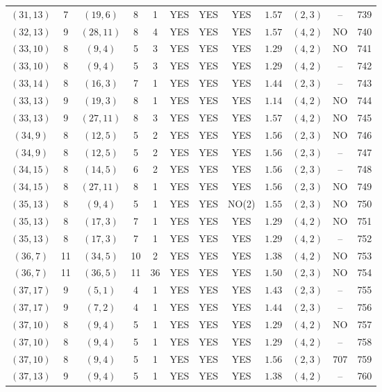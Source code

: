 \begin{longtable}{|c|c|c|c|c|c|c|c|c|c|c|c|}
$(31,13)$ & 7 & $(19,6)$ & 8 & 1 & YES & YES & YES & $1.57$ & $(2,3)$ & -- & 739\\
$(32,13)$ & 9 & $(28,11)$ & 8 & 4 & YES & YES & YES & $1.57$ & $(4,2)$ & NO & 740\\
$(33,10)$ & 8 & $(9,4)$ & 5 & 3 & YES & YES & YES & $1.29$ & $(4,2)$ & NO & 741\\
$(33,10)$ & 8 & $(9,4)$ & 5 & 3 & YES & YES & YES & $1.29$ & $(4,2)$ & -- & 742\\
$(33,14)$ & 8 & $(16,3)$ & 7 & 1 & YES & YES & YES & $1.44$ & $(2,3)$ & -- & 743\\
$(33,13)$ & 9 & $(19,3)$ & 8 & 1 & YES & YES & YES & $1.14$ & $(4,2)$ & NO & 744\\
$(33,13)$ & 9 & $(27,11)$ & 8 & 3 & YES & YES & YES & $1.57$ & $(4,2)$ & NO & 745\\
$(34,9)$ & 8 & $(12,5)$ & 5 & 2 & YES & YES & YES & $1.56$ & $(2,3)$ & NO & 746\\
$(34,9)$ & 8 & $(12,5)$ & 5 & 2 & YES & YES & YES & $1.56$ & $(2,3)$ & -- & 747\\
$(34,15)$ & 8 & $(14,5)$ & 6 & 2 & YES & YES & YES & $1.56$ & $(2,3)$ & -- & 748\\
$(34,15)$ & 8 & $(27,11)$ & 8 & 1 & YES & YES & YES & $1.56$ & $(2,3)$ & NO & 749\\
$(35,13)$ & 8 & $(9,4)$ & 5 & 1 & YES & YES & NO(2) & $1.55$ & $(2,3)$ & NO & 750\\
$(35,13)$ & 8 & $(17,3)$ & 7 & 1 & YES & YES & YES & $1.29$ & $(4,2)$ & NO & 751\\
$(35,13)$ & 8 & $(17,3)$ & 7 & 1 & YES & YES & YES & $1.29$ & $(4,2)$ & -- & 752\\
$(36,7)$ & 11 & $(34,5)$ & 10 & 2 & YES & YES & YES & $1.38$ & $(4,2)$ & NO & 753\\
$(36,7)$ & 11 & $(36,5)$ & 11 & 36 & YES & YES & YES & $1.50$ & $(2,3)$ & NO & 754\\
$(37,17)$ & 9 & $(5,1)$ & 4 & 1 & YES & YES & YES & $1.43$ & $(2,3)$ & -- & 755\\
$(37,17)$ & 9 & $(7,2)$ & 4 & 1 & YES & YES & YES & $1.44$ & $(2,3)$ & -- & 756\\
$(37,10)$ & 8 & $(9,4)$ & 5 & 1 & YES & YES & YES & $1.29$ & $(4,2)$ & NO & 757\\
$(37,10)$ & 8 & $(9,4)$ & 5 & 1 & YES & YES & YES & $1.29$ & $(4,2)$ & -- & 758\\
$(37,10)$ & 8 & $(9,4)$ & 5 & 1 & YES & YES & YES & $1.56$ & $(2,3)$ & 707 & 759\\
$(37,13)$ & 9 & $(9,4)$ & 5 & 1 & YES & YES & YES & $1.38$ & $(4,2)$ & -- & 760\\

\end{longtable}
